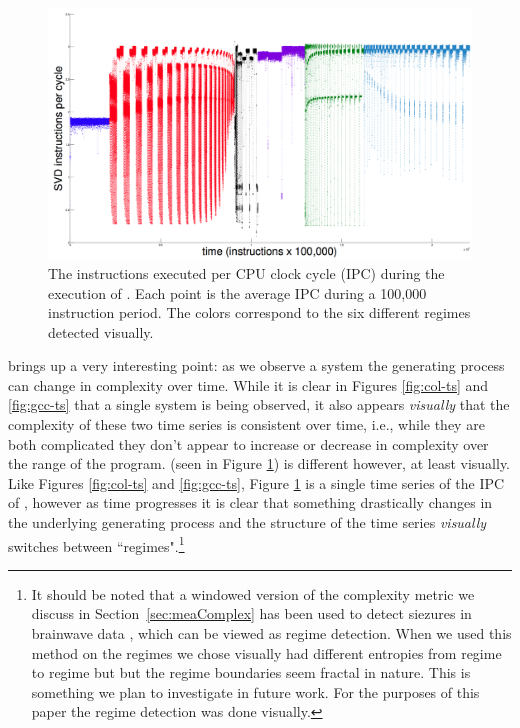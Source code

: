 \begin{figure}[t]
    \centering
    \includegraphics[width=\columnwidth]{figs/SVD1RegimesColored}
    \caption{The instructions executed per CPU clock cycle (IPC) during the execution of \svd. Each point is the average IPC during a 100,000 instruction period. The colors correspond to the six different regimes detected visually.}
    \label{fig:svd-ts-colored}
  \end{figure}

\svd brings up a very interesting point: as we observe a system the generating process can change in complexity over time. While it is clear in Figures \ref{fig:col-ts} and \ref{fig:gcc-ts} that a single system is being observed, it also appears \emph{visually} that the complexity of these two time series is consistent over time, i.e., while they are both complicated they don't appear to increase or decrease in complexity over the range of the program. \svd (seen in Figure \ref{fig:svd-ts-colored}) is different however, at least visually. Like Figures \ref{fig:col-ts} and \ref{fig:gcc-ts}, Figure \ref{fig:svd-ts-colored} is a single time series of the IPC of \svd, however as time progresses it is clear that something drastically changes in the underlying generating process and the structure of the time series  \emph{visually} switches between ``regimes".\footnote{It should be noted that a windowed version of the complexity metric we discuss in Section~\ref{sec:meaComplex} has been used to detect siezures in brainwave data \cite{cao2004det}, which can be viewed as regime detection. When we used this method on \svd the regimes we chose visually had different entropies from regime to regime but but the regime boundaries seem fractal in nature. This is something we plan to investigate in future work. For the purposes of this paper the regime detection was done visually.}

